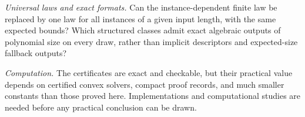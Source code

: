 \emph{Universal laws and exact formats.} Can the instance-dependent finite
law be replaced by one law for all instances of a given input length, with
the same expected bounds? Which structured classes admit exact algebraic
outputs of polynomial size on every draw, rather than implicit descriptors
and expected-size fallback outputs?

\emph{Computation.} The certificates are exact and checkable, but their
practical value depends on certified convex solvers, compact proof records,
and much smaller constants than those proved here. Implementations and
computational studies are needed before any practical conclusion can be
drawn.

